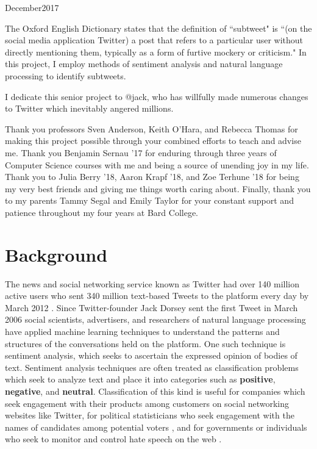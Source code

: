 \documentclass[11pt, twoside, reqno]{book}
\begin{document}
    {December}{2017}

\abstr

The Oxford English Dictionary states that the definition of ``subtweet" is ``(on the social media application Twitter) a post that refers to a particular user without directly mentioning them, typically as a form of furtive mockery or criticism." In this project, I employ methods of sentiment analysis and natural language processing to identify subtweets.

\tableofcontents

\dedic

I dedicate this senior project to @jack, who has willfully made numerous changes to Twitter which inevitably angered millions.

\acknowl

Thank you professors Sven Anderson, Keith O'Hara, and Rebecca Thomas for making this project possible through your combined efforts to teach and advise me. Thank you Benjamin Sernau '17 for enduring through three years of Computer Science courses with me and being a source of unending joy in my life. Thank you to Julia Berry '18, Aaron Krapf '18, and Zoe Terhune '18 for being my very best friends and giving me things worth caring about. Finally, thank you to my parents Tammy Segal and Emily Taylor for your constant support and patience throughout my four years at Bard College. 

\startmain


\intro

\section{Background}
\label{secI1}

The news and social networking service known as Twitter had over 140 million active users who sent 340 million text-based Tweets to the platform every day by March 2012 \cite{TWITTER}. Since Twitter-founder Jack Dorsey sent the first Tweet in March 2006 \cite{JACK} social scientists, advertisers, and researchers of natural language processing have applied machine learning techniques to understand the patterns and structures of the conversations held on the platform. One such technique is sentiment analysis, which seeks to ascertain the expressed opinion of bodies of text. Sentiment analysis techniques are often treated as classification problems which seek to analyze text and place it into categories such as \textbf{positive}, \textbf{negative}, and \textbf{neutral}. Classification of this kind is useful for companies which seek engagement with their products among customers \cite{IBM} on social networking websites like Twitter, for political statisticians who seek engagement with the names of candidates among potential voters \cite{POLITICS}, and for governments or individuals who seek to monitor and control hate speech on the web \cite{HATE}. 
\end{document}
